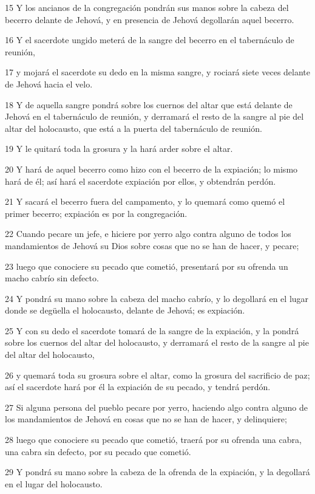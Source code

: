 \par 15 Y los ancianos de la congregación pondrán sus manos sobre la cabeza del becerro delante de Jehová, y en presencia de Jehová degollarán aquel becerro.
\par 16 Y el sacerdote ungido meterá de la sangre del becerro en el tabernáculo de reunión,
\par 17 y mojará el sacerdote su dedo en la misma sangre, y rociará siete veces delante de Jehová hacia el velo.
\par 18 Y de aquella sangre pondrá sobre los cuernos del altar que está delante de Jehová en el tabernáculo de reunión, y derramará el resto de la sangre al pie del altar del holocausto, que está a la puerta del tabernáculo de reunión.
\par 19 Y le quitará toda la grosura y la hará arder sobre el altar.
\par 20 Y hará de aquel becerro como hizo con el becerro de la expiación; lo mismo hará de él; así hará el sacerdote expiación por ellos, y obtendrán perdón.
\par 21 Y sacará el becerro fuera del campamento, y lo quemará como quemó el primer becerro; expiación es por la congregación.
\par 22 Cuando pecare un jefe, e hiciere por yerro algo contra alguno de todos los mandamientos de Jehová su Dios sobre cosas que no se han de hacer, y pecare;
\par 23 luego que conociere su pecado que cometió, presentará por su ofrenda un macho cabrío sin defecto.
\par 24 Y pondrá su mano sobre la cabeza del macho cabrío, y lo degollará en el lugar donde se degüella el holocausto, delante de Jehová; es expiación.
\par 25 Y con su dedo el sacerdote tomará de la sangre de la expiación, y la pondrá sobre los cuernos del altar del holocausto, y derramará el resto de la sangre al pie del altar del holocausto,
\par 26 y quemará toda su grosura sobre el altar, como la grosura del sacrificio de paz; así el sacerdote hará por él la expiación de su pecado, y tendrá perdón.
\par 27 Si alguna persona del pueblo pecare por yerro, haciendo algo contra alguno de los mandamientos de Jehová en cosas que no se han de hacer, y delinquiere;
\par 28 luego que conociere su pecado que cometió, traerá por su ofrenda una cabra, una cabra sin defecto, por su pecado que cometió.
\par 29 Y pondrá su mano sobre la cabeza de la ofrenda de la expiación, y la degollará en el lugar del holocausto.
